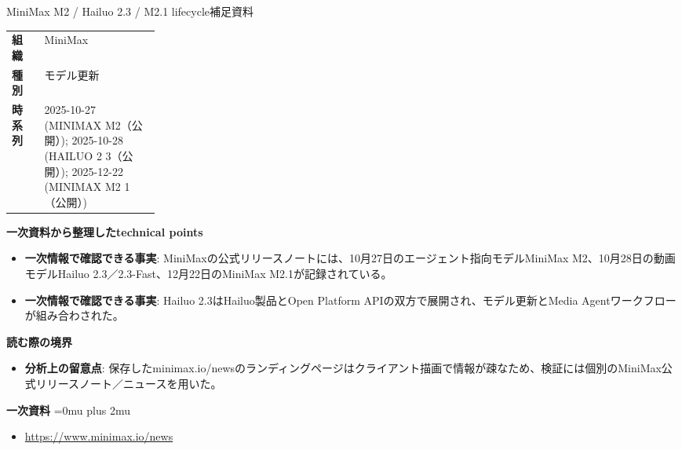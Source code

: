 \begin{technicalnote}{MiniMax M2 / Hailuo 2.3 / M2.1 lifecycle}{補足資料}
\begingroup
\begin{tabularx}{\linewidth}{@{}>{\bfseries}p{0.22\linewidth}X@{}}
組織 & MiniMax \\
種別 & モデル更新 \\
時系列 & 2025-10-27 (MINIMAX M2（公開）); 2025-10-28 (HAILUO 2 3（公開）); 2025-12-22 (MINIMAX M2 1（公開）) \\
\end{tabularx}
\smallskip
{\bfseries 一次資料から整理したtechnical points}
\begin{itemize}[leftmargin=1.5em,itemsep=0.35em]
\item \textbf{一次情報で確認できる事実}: MiniMaxの公式リリースノートには、10月27日のエージェント指向モデルMiniMax M2、10月28日の動画モデルHailuo 2.3／2.3-Fast、12月22日のMiniMax M2.1が記録されている。
\item \textbf{一次情報で確認できる事実}: Hailuo 2.3はHailuo製品とOpen Platform APIの双方で展開され、モデル更新とMedia Agentワークフローが組み合わされた。
\end{itemize}
\begin{minipage}{\linewidth}
{\bfseries 読む際の境界}
\begin{itemize}[leftmargin=1.5em,itemsep=0.35em]
\item \textbf{分析上の留意点}: 保存したminimax.io/newsのランディングページはクライアント描画で情報が疎なため、検証には個別のMiniMax公式リリースノート／ニュースを用いた。
\end{itemize}
\begin{samepage}
{\bfseries 一次資料}
\begingroup\sloppy
\Urlmuskip=0mu plus 2mu\relax
\begin{itemize}[leftmargin=1.5em,itemsep=0.25em]
\item {\scriptsize\url{https://www.minimax.io/news}}
\end{itemize}
\endgroup
\end{samepage}
\end{minipage}
\endgroup
\end{technicalnote}
\medskip
